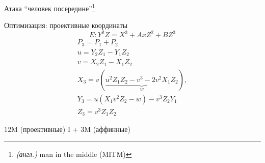 \documentclass{beamer}
\begin{document}
\begin{frame}{Атака ``человек посередине''\footnote{\textit{(англ.)} man in the middle (MITM)}}
\begin{center}
		\end{center}

	\end{frame}

	
	
	
	\begin{frame}{Оптимизация: проективные координаты}
		\[E: Y^2 Z = X^3+ A x Z^2 + B Z^3\]
		\begin{gather*}
			P_3 = P_1 + P_2 \\
			u = Y_2 Z_1 - Y_1 Z_2\\
			v = X_2 Z_1 - X_1 Z_2 \\
			X_3 = v(\underbrace{u^2 Z_1 Z_2 - v^3 - 2 v^2 X_1 Z_2}_w), \\
			Y_3 = u(X_1 v^2 Z_2 - w) - v^3 Z_2 Y_1 \\
			Z_3 = v^3 Z_1 Z_2
		\end{gather*}
		\begin{center}
			\begin{tcolorbox}[enhanced,hbox,colback=box-blue-color!15,colframe=box-blue-color,title=Сложность,center title]
				\begin{varwidth}{\textwidth}
					$12$M (проективные)  I + $3$M (аффинные)
				\end{varwidth}
			\end{tcolorbox}	
		\end{center}
	\end{frame}
	
\end{document}
